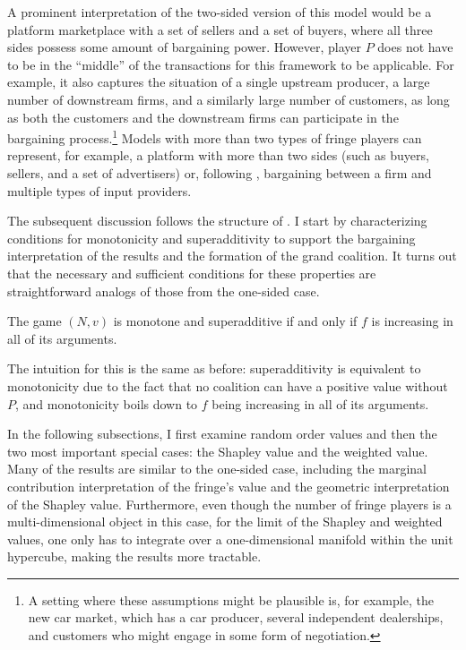 A prominent interpretation of the two-sided version of this model would be a platform marketplace with a set of sellers and a set of buyers, where all three sides possess some amount of bargaining power.
However, player $P$ does not have to be in the ``middle'' of the transactions for this framework to be applicable.
For example, it also captures the situation of a single upstream producer, a large number of downstream firms, and a similarly large number of customers, as long as both the customers and the downstream firms can participate in the bargaining process.\footnote{
    A setting where these assumptions might be plausible is, for example, the new car market, which has a car producer, several independent dealerships, and customers who might engage in some form of negotiation.
}
Models with more than two types of fringe players can represent, for example, a platform with more than two sides (such as buyers, sellers, and a set of advertisers) or, following \textcite{stole1996intra}, bargaining between a firm and multiple types of input providers.

The subsequent discussion follows the structure of .
I start by characterizing conditions for monotonicity and superadditivity to support the bargaining interpretation of the results and the formation of the grand coalition.
It turns out that the necessary and sufficient conditions for these properties are straightforward analogs of those from the one-sided case.
\begin{proposition}
    The game $(N, v)$ is monotone and superadditive if and only if $f$ is increasing in all of its arguments.
\end{proposition}
The intuition for this is the same as before: superadditivity is equivalent to monotonicity due to the fact that no coalition can have a positive value without $P$, and monotonicity boils down to $f$ being increasing in all of its arguments.

In the following subsections, I first examine random order values and then the two most important special cases: the Shapley value and the weighted value.
Many of the results are similar to the one-sided case, including the marginal contribution interpretation of the fringe's value and the geometric interpretation of the Shapley value.
Furthermore, even though the number of fringe players is a multi-dimensional object in this case, for the limit of the Shapley and weighted values, one only has to integrate over a one-dimensional manifold within the unit hypercube, making the results more tractable.

